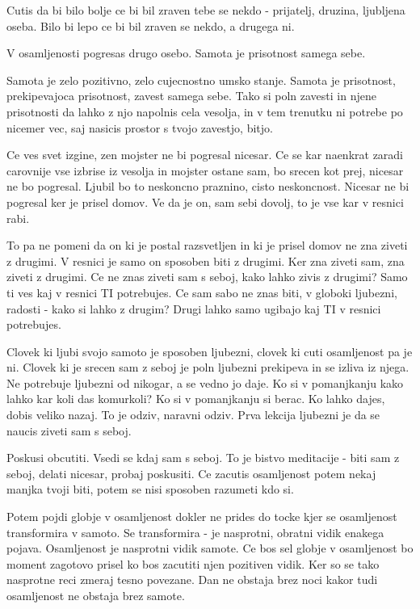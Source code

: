 Cutis da bi bilo bolje ce bi bil zraven tebe se nekdo - prijatelj, druzina, ljubljena oseba. Bilo bi lepo ce bi bil zraven se nekdo, a drugega ni. 

V osamljenosti pogresas drugo osebo. Samota je prisotnost samega sebe. 

Samota je zelo pozitivno, zelo cujecnostno umsko stanje. Samota je prisotnost, prekipevajoca prisotnost, zavest samega sebe. Tako si poln zavesti in njene prisotnosti da lahko z njo napolnis cela vesolja, in v tem trenutku ni potrebe po nicemer vec, saj nasicis prostor s tvojo zavestjo, bitjo. 

Ce ves svet izgine, zen mojster ne bi pogresal nicesar. Ce se kar naenkrat zaradi carovnije vse izbrise iz vesolja in mojster ostane sam, bo srecen kot prej, nicesar ne bo pogresal. Ljubil bo to neskoncno praznino, cisto neskoncnost. Nicesar ne bi pogresal ker je prisel domov. Ve da je on, sam sebi dovolj, to je vse kar v resnici rabi. 

To pa ne pomeni da on ki je postal razsvetljen in ki je prisel domov ne zna ziveti z drugimi. V resnici je samo on sposoben biti z drugimi. Ker zna ziveti sam, zna ziveti z drugimi. Ce ne znas ziveti sam s seboj, kako lahko zivis z drugimi? Samo ti ves kaj v resnici TI potrebujes. Ce sam sabo ne znas biti, v globoki ljubezni, radosti - kako si lahko z drugim? Drugi lahko samo ugibajo kaj TI v resnici potrebujes. 

Clovek ki ljubi svojo samoto je sposoben ljubezni, clovek ki cuti osamljenost pa je ni. Clovek ki je srecen sam z seboj je poln ljubezni prekipeva in se izliva iz njega. Ne potrebuje ljubezni od nikogar, a se vedno jo daje. Ko si v pomanjkanju kako lahko kar koli das komurkoli? Ko si v pomanjkanju si berac. Ko lahko dajes, dobis veliko nazaj. To je odziv, naravni odziv. Prva lekcija ljubezni je da se naucis ziveti sam s seboj. 

Poskusi obcutiti. Vsedi se kdaj sam s seboj. To je bistvo meditacije - biti sam z seboj, delati nicesar, probaj poskusiti. Ce zacutis osamljenost potem nekaj manjka tvoji biti, potem se nisi sposoben razumeti kdo si. 

Potem pojdi globje v osamljenost dokler ne prides do tocke kjer se osamljenost transformira v samoto. Se transformira - je nasprotni, obratni vidik enakega pojava. Osamljenost je nasprotni vidik samote. Ce bos sel globje v osamljenost bo moment zagotovo prisel ko bos zacutiti njen pozitiven vidik. Ker so se tako nasprotne reci zmeraj tesno povezane. Dan ne obstaja brez noci kakor tudi osamljenost ne obstaja brez samote. 


